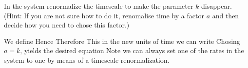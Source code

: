 In the system
renormalize the timescale to make the parameter $k$ disappear.
(Hint: If you are not sure how to do it, renomalise time by a factor $a$ and then decide how you need to chose this factor.)

\solution 
We define 
Hence
Therefore
This in the new units of time we can write 
Chosing $a=k$, yields the desired equation
Note we can always set one of the rates in the system to one by means of a timescale renormalization. 
